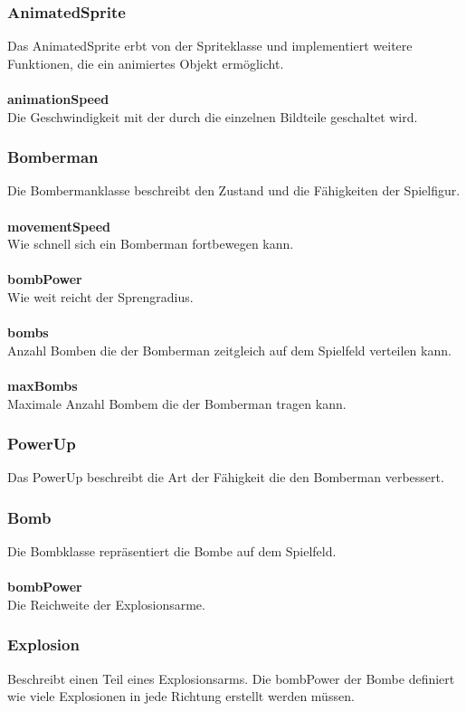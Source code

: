 \documentclass[11pt]{scrartcl}
\begin{document}
\subsubsection{AnimatedSprite}
\label{sec:AnimatedSprite}
Das AnimatedSprite erbt von der Spriteklasse und implementiert weitere Funktionen, die ein animiertes Objekt ermöglicht.
\\\\
\textbf{animationSpeed}\\
Die Geschwindigkeit mit der durch die einzelnen Bildteile geschaltet wird.

\subsubsection{Bomberman}
\label{sec:Bomberman}
Die Bombermanklasse beschreibt den Zustand und die Fähigkeiten der Spielfigur.
\\\\
\textbf{movementSpeed }\\
Wie schnell sich ein Bomberman fortbewegen kann.
\\\\
\textbf{bombPower}\\
Wie weit reicht der Sprengradius.
\\\\
\textbf{bombs}\\ 
Anzahl Bomben die der Bomberman zeitgleich auf dem Spielfeld verteilen kann.
\\\\
\textbf{maxBombs}\\
Maximale Anzahl Bombem die der Bomberman tragen kann.

\subsubsection{PowerUp}
\label{sec:PowerUp}
Das PowerUp beschreibt die Art der Fähigkeit die den Bomberman verbessert.

\newpage

\subsubsection{Bomb}
\label{sec:Bomb}
Die Bombklasse repräsentiert die Bombe auf dem Spielfeld.
\\\\
\textbf{bombPower}\\
Die Reichweite der Explosionsarme.

\subsubsection{Explosion}
\label{sec:Explosion}
Beschreibt einen Teil eines Explosionsarms. Die bombPower der Bombe definiert wie viele Explosionen in jede Richtung erstellt werden müssen.
\end{document}
